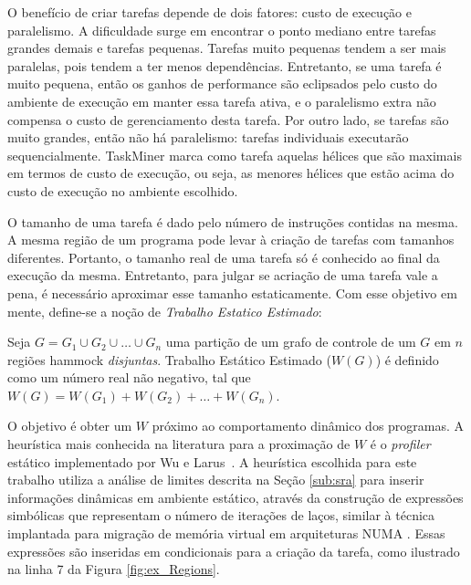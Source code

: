\documentclass[sigplan,10pt,review]{acmart}
\newcommand\Taskminer{\mbox{\textsf{TaskMiner}}}
\begin{document}
O benefício de criar tarefas depende de dois fatores: custo de execução e paralelismo.
A dificuldade surge em encontrar o ponto mediano entre tarefas grandes demais e tarefas pequenas.
Tarefas muito pequenas tendem a ser mais paralelas, pois tendem a ter menos dependências. Entretanto,
se uma tarefa é muito pequena, então os ganhos de performance são eclipsados pelo custo do ambiente de execução
em manter essa tarefa ativa, e o paralelismo extra não compensa o custo de gerenciamento desta tarefa.
Por outro lado, se tarefas são muito grandes, então não há paralelismo: tarefas individuais executarão sequencialmente.
{\Taskminer} marca como tarefa aquelas hélices que são maximais em termos de custo de execução, ou seja, as menores hélices
que estão acima do custo de execução no ambiente escolhido.

O tamanho de uma tarefa é dado pelo número de instruções contidas na mesma. A mesma região de um programa
pode levar à criação de tarefas com tamanhos diferentes. Portanto, o tamanho real de uma tarefa só é conhecido ao final 
da execução da mesma. Entretanto, para julgar se acriação de uma tarefa vale a pena, é necessário aproximar esse tamanho
estaticamente. Com esse objetivo em mente, define-se a noção de {\em Trabalho Estatico Estimado}:

\begin{definition}
\label{def:swe}
Seja $G = G_1 \cup G_2 \cup \ldots \cup G_n$ uma partição de um grafo de controle
de um $G$ em $n$ regiões hammock {\em disjuntas}.
Trabalho Estático Estimado ($W(G)$) é definido como um número real não negativo,
tal que $W(G) = W(G_1) + W(G_2) + \ldots + W(G_n)$.
\end{definition}

O objetivo é obter um $W$ próximo ao comportamento dinâmico dos programas.
A heurística mais conhecida na literatura para a proximação de $W$ é o 
\textit{profiler} estático implementado por Wu e Larus~\cite{Wu94}.
A heurística escolhida para este trabalho utiliza a análise de limites
descrita na Seção \ref{sub:sra} para inserir informações dinâmicas em ambiente estático,
através da construção de expressões simbólicas que representam o número de iterações
de laços, similar à técnica implantada para migração de memória virtual em arquiteturas NUMA
\cite{Piccoli14}. Essas expressões são inseridas em condicionais para a criação da
tarefa, como ilustrado na linha 7 da Figura \ref{fig:ex_Regions}.
\end{document}
